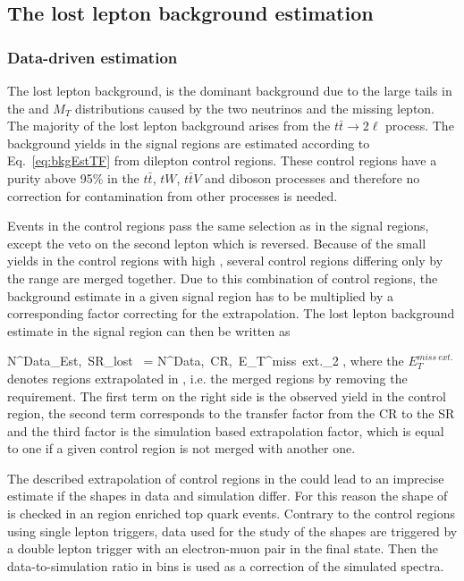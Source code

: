 \newpage
\subsection{The lost lepton background estimation}

\subsubsection{Data-driven estimation}

The lost lepton background,  is the dominant background due to the large tails in the \MET and $M_{T}$ distributions caused by the two neutrinos and the missing lepton. The majority of the lost lepton background arises from the $t\bar{t} \to 2\ell$ process. The background yields in the signal regions are estimated according to Eq.~\ref{eq:bkgEstTF} from dilepton control regions. These control regions have a purity above 95\% in the $t\bar{t}$, $tW$, $t\bar{t}V$ and diboson processes and therefore no correction for contamination from other processes is needed. 

Events in the control regions pass the same selection as in the signal regions, except the veto on the second lepton which is reversed. Because of the small yields in the control regions with high \MET, several control regions differing only by the \MET range are merged together. Due to this combination of control regions, the background estimate in a given signal region has to be multiplied by a corresponding factor correcting for the \MET extrapolation. The lost lepton background estimate in the signal region can then be written as

{
N^{Data_{Est},~SR}_{lost~\ell}  =  N^{Data,~CR,~E_{T}^{miss}~ext.}_{2\ell} \times  {} \times {},
}
where the $E_{T}^{miss~ext.}$ denotes regions extrapolated in \MET, i.e. the merged regions by removing the \MET requirement. The first term on the right side is the observed yield in the control region, the second term corresponds to the transfer factor from the CR to the SR  and the third factor is the simulation based \MET extrapolation factor, which is equal to one if a given control region is not merged with another one.

The described extrapolation of control regions in the \MET could lead to an imprecise estimate if the \MET shapes in data and simulation differ. For this reason the shape of \MET is checked in an region enriched top quark events. Contrary to the control regions using single lepton triggers, data used for the study of the \MET shapes are triggered by a  double lepton trigger with an electron-muon pair in the final state. Then the data-to-simulation ratio in \MET bins is used as a correction of the simulated \MET spectra. 

